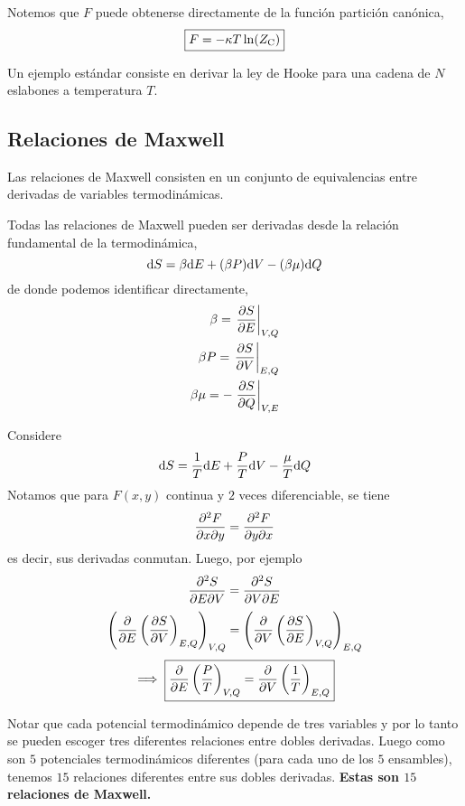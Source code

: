 Notemos que $F$ puede obtenerse directamente de la función partición canónica,
\begin{equation}
  \boxed{F=-\kappa T\ln (Z_{\rm C})}
\end{equation}

\begin{ej}
	Un ejemplo estándar consiste en derivar la ley de Hooke para una cadena de $N$ eslabones a temperatura $T$.
\end{ej}

\subsection{Relaciones de Maxwell}
Las relaciones de Maxwell consisten en un conjunto de equivalencias entre derivadas de variables termodinámicas.

Todas las relaciones de Maxwell pueden ser derivadas desde la relación fundamental de la termodinámica,
\begin{equation}
  \dd S=\beta\dd E+(\beta P)\dd V-(\beta\mu )\dd Q
\end{equation}
de donde podemos identificar directamente,
\begin{align}
  \b=\eval{\pdv{S}{E}}_{V,Q}\\
  \b P=\eval{\pdv{S}{V}}_{E,Q}\\
  \b\m=-\eval{\pdv{S}{Q}}_{V,E}
\end{align}

\begin{ej}
	Considere
	\begin{equation}
  \dd S=\frac{1}{T}\dd E+\frac{P}{T}\dd V-\frac{\mu }{T}\dd Q
\end{equation}
Notamos que para $F(x,y)$ continua y $2$ veces diferenciable, se tiene
\begin{equation}
  \pdv{F}{x}{y}=\pdv{F}{y}{x}
\end{equation}
es decir, sus derivadas conmutan. Luego, por ejemplo
\begin{equation}
  \pdv{S}{E}{V}=\pdv{S}{V}{E}
\end{equation}
\begin{equation}
	\left(\pdv{E}\left(\pdv{S}{V}\right)_{E,Q}\right)_{V,Q}=\left(\pdv{V}\left(\pdv{S}{E}\right)_{V,Q}\right)_{E,Q}
\end{equation}
\begin{equation}
  \implies \boxed{\pdv{E}\left(\frac{P}{T}\right)_{V,Q}=\pdv{V}\left(\frac{1}{T}\right)_{E,Q}}
\end{equation}
\end{ej}
Notar que cada potencial termodinámico depende de tres variables y por lo tanto se pueden escoger tres diferentes relaciones entre dobles derivadas. Luego como son $5$ potenciales termodinámicos diferentes (para cada uno de los $5$ ensambles), tenemos $15$ relaciones diferentes entre sus dobles derivadas. \textbf{Estas son $15$ relaciones de Maxwell.}

